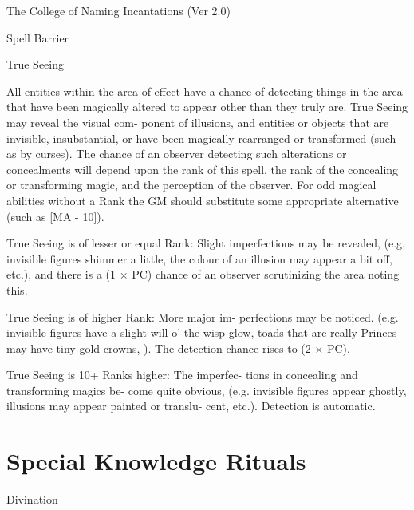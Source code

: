 \begin{Chapter}{The College of Naming Incantations (Ver 2.0)}
\begin{spell}[S-9]{Spell Barrier }
\begin{effects}
\end{effects}
\end{spell}

\begin{spell}[S-10]{True Seeing }

\begin{effects}
All entities within the area of effect have a 
chance  of  detecting  things  in  the  area  that  have 
been  magically  altered  to  appear  other  than  they 
truly  are.  True  Seeing  may  reveal  the  visual  com-
ponent  of  illusions, and  entities  or  objects  that  are 
invisible,  insubstantial,  or  have  been  magically 
rearranged or transformed (such as by curses). The 
chance of an observer detecting such alterations or 
concealments  will  depend  upon  the  rank  of  this 
spell,  the  rank  of  the  concealing  or  transforming 
magic, and the perception of the observer. For odd 
magical  abilities  without  a  Rank  the  GM  should 
substitute  some  appropriate  alternative  (such  as 
[MA - 10]). 

True  Seeing  is  of  lesser  or  equal  Rank:  Slight 
imperfections  may  be  revealed,  (e.g.  invisible 
figures  shimmer  a  little,  the  colour  of  an  illusion 
may appear a bit off, etc.), and there is a (1 × PC) 
chance  of  an  observer  scrutinizing  the  area  noting 
this. 

True  Seeing  is  of  higher  Rank:  More  major  im-
perfections  may  be  noticed.  (e.g.  invisible  figures 
have  a  slight  will-o’-the-wisp  glow,  toads  that  are 
really  Princes  may  have  tiny  gold  crowns,  ).  The 
detection chance rises to (2 × PC). 

True Seeing is 10+ Ranks higher: The imperfec-
tions  in  concealing  and  transforming  magics  be-
come  quite  obvious,  (e.g.  invisible  figures  appear 
ghostly,  illusions  may  appear  painted  or  translu-
cent, etc.). Detection is automatic. 


\end{effects}
\end{spell}

\section{Special Knowledge Rituals}

\begin{ritual}[R-1]{Divination }


\end{ritual}
\end{Chapter}
